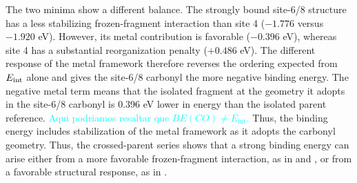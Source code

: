 {The two  minima show a different balance. The strongly bound
site-6/8 structure has a less stabilizing frozen-fragment interaction than
site 4 ($-1.776$ versus $-1.920$ eV). However, its metal contribution is
favorable ($-0.396$ eV), whereas site 4 has a substantial reorganization
penalty ($+0.486$ eV). The different response of the metal framework therefore
reverses the ordering expected from $E_{\rm int}$ alone and gives the
site-6/8 carbonyl the more negative binding energy. {The negative metal
term means that the isolated  fragment at the geometry it adopts in
the site-6/8 carbonyl is 0.396 eV lower in energy than the isolated parent
reference. \textcolor{cyan}{Aqui podriamos resaltar que $BE(CO) \neq E_{\mathrm{int}}$.} Thus, the binding energy includes stabilization of the metal
framework as it adopts the carbonyl geometry.} Thus, the crossed-parent series
shows that a strong  binding energy can arise either from a more
{favorable frozen-fragment interaction}, as in  and , or from a
favorable structural response, as in .}

